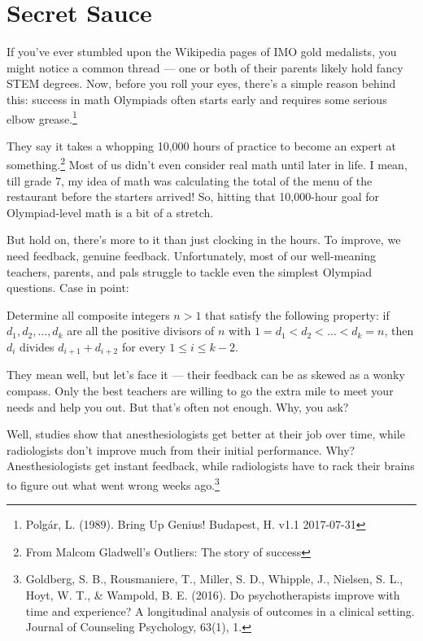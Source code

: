 \section{Secret Sauce}
If you've ever stumbled upon the Wikipedia pages of IMO gold medalists, you might notice a common thread –-- one or both of their parents likely hold fancy STEM degrees. 
Now, before you roll your eyes, there's a simple reason behind this: success in math Olympiads often starts early and requires some serious elbow grease.\footnote{Polgár, L. (1989). Bring Up Genius! Budapest, H. v1.1 2017-07-31}\par
They say it takes a whopping 10,000 hours of practice to become an expert at something.\footnote{From Malcom Gladwell's Outliers: The story of success} 
Most of us didn't even consider real math until later in life. I mean, till grade 7, my idea of math was calculating the total of the menu of the restaurant before the starters arrived! 
So, hitting that 10,000-hour goal for Olympiad-level math is a bit of a stretch.\par\medskip
But hold on, there's more to it than just clocking in the hours. To improve, we need feedback, genuine feedback.
 Unfortunately, most of our well-meaning teachers, parents, and pals struggle to tackle even the simplest Olympiad questions. Case in point:\\
\begin{example}[IMO 2023, P1]
Determine all composite integers $n>1$ that satisfy the following property: if $d_1,d_2,\dots,d_k$ are all the positive divisors of $n$ with $1=d_1<d_2<\dots<d_k=n$, then $d_i$ divides $d_{i+1}+d_{i+2}$ for every $1\le i \le k-2$.
\end{example}
They mean well, but let's face it –-- their feedback can be as skewed as a wonky compass. Only the best teachers are willing to go the extra mile to meet your needs and help you out. 
But that's often not enough. Why, you ask?\par
Well, studies show that anesthesiologists get better at their job over time, while radiologists don't improve much from their initial performance. 
Why? Anesthesiologists get instant feedback, while radiologists have to rack their brains to figure out what went wrong weeks ago.\footnote{Goldberg, S. B., Rousmaniere, T., Miller, S. D., Whipple, J., Nielsen, S. L., Hoyt, W. T., \& Wampold, B. E. (2016). 
Do psychotherapists improve with time and experience? A longitudinal analysis of outcomes in a clinical setting. Journal of Counseling Psychology, 63(1), 1.}\par \medskip
